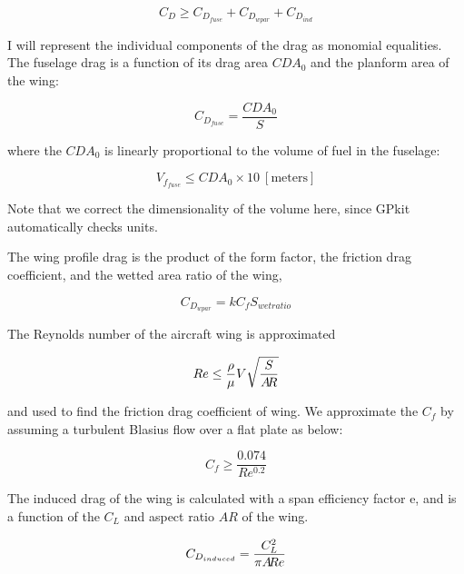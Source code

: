 \begin{equation}
    C_D \geq C_{D_{fuse}} + C_{D_{wpar}} + C_{D_{ind}}
\label{e:cd}
\end{equation}

I will represent the individual components of the drag as monomial equalities.
The fuselage drag is a function of its drag area $CDA_0$ and the planform area of the wing:

\begin{equation}
    C_{D_{fuse}} = \frac{CDA_0}{S}
\label{e:cdfuse}
\end{equation}

where the $CDA_0$ is linearly proportional to the volume of fuel in the fuselage:

\begin{equation}
    V_{f_{fuse}} \leq CDA_0 \times 10 ~\mathrm{[meters]}
\label{e:vffuse}
\end{equation}

Note that we correct the dimensionality of the volume here, since GPkit automatically checks units. 

The wing profile drag is the product of the form factor, the friction drag coefficient,
and the wetted area ratio of the wing,

\begin{equation}
    C_{D_{wpar}} = k C_f S_{wetratio}
\label{e:cdwpar}
\end{equation}

The Reynolds number of the aircraft wing is approximated

\begin{equation}
    Re \leq \frac{\rho}{\mu} V \sqrt{\frac{S}{A\hspace{-2.0pt}R}}
\label{e:re}
\end{equation}

and used to find the friction drag coefficient of wing. We approximate the $C_f$ by assuming a turbulent Blasius flow over a flat plate as below:

\begin{equation}
    C_f \geq \frac{0.074} {Re^{0.2}}
\end{equation}

The induced drag of the wing is calculated with a span efficiency factor e, and is a function of the $C_L$ and aspect ratio $AR$ of the wing.

\begin{equation}
    C_{D_{induced}} = \frac{C_L^2}{\pi A\hspace{-2.0pt}R e}
\label{e:cdinduced}
\end{equation}


